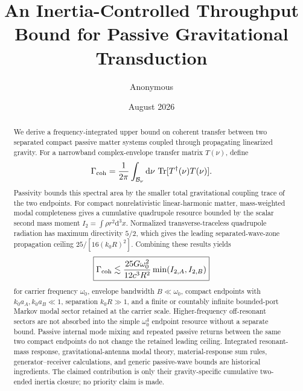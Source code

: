 \documentclass[11pt]{article}
\title{An Inertia-Controlled Throughput Bound for Passive Gravitational Transduction}
\author{Anonymous}
\date{August 2026}
\newcommand{\dd}{\mathrm d}
\newcommand{\Tr}{\operatorname{Tr}}
\begin{document}
\maketitle

\begin{abstract}
We derive a frequency-integrated upper bound on coherent transfer between two separated compact passive matter systems coupled through propagating linearized gravity. For a narrowband complex-envelope transfer matrix $T(\nu)$, define
\begin{equation}
\Gamma_{\rm coh}=\frac{1}{2\pi}\int_{\mathcal B_\nu}\dd\nu\,\Tr[T^\dagger(\nu)T(\nu)].
\end{equation}
Passivity bounds this spectral area by the smaller total gravitational coupling trace of the two endpoints. For compact nonrelativistic linear-harmonic matter, mass-weighted modal completeness gives a cumulative quadrupole resource bounded by the scalar second mass moment $I_2=\int\rho r^2\dd^3x$. Normalized transverse-traceless quadrupole radiation has maximum directivity $5/2$, which gives the leading separated-wave-zone propagation ceiling $25/[16(k_0R)^2]$. Combining these results yields
\begin{equation}
\boxed{
\Gamma_{\rm coh}
\lesssim
\frac{25G\omega_0^2}{12c^3R^2}\min(I_{2,A},I_{2,B})
}
\end{equation}
for carrier frequency $\omega_0$, envelope bandwidth $B\ll\omega_0$, compact endpoints with $k_0a_A,k_0a_B\ll1$, separation $k_0R\gg1$, and a finite or countably infinite bounded-port Markov modal sector retained at the carrier scale. Higher-frequency off-resonant sectors are not absorbed into the simple $\omega_0^4$ endpoint resource without a separate bound. Passive internal mode mixing and repeated passive returns between the same two compact endpoints do not change the retained leading ceiling. Integrated resonant-mass response, gravitational-antenna modal theory, material-response sum rules, generator--receiver calculations, and generic passive-wave bounds are historical ingredients. The claimed contribution is only their gravity-specific cumulative two-ended inertia closure; no priority claim is made.
\end{abstract}










\end{document}
